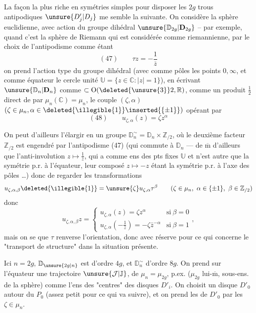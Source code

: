 La façon la plus riche en symétries simples pour disposer les $2g$ trous antipodiques
$\unsure{D'_j|D_j}$ me semble la suivante. On  considère
la sphère euclidienne, avec action du groupe dihédral
$\unsure{\mathbb D_{2g}|\mathbf D_{2g}}$ -- par exemple, quand c'est la sphère de Riemann qui est
considérée comme riemannienne, par le choix de l'antipodisme comme étant
\[
(47)\qquad \tau z=-\frac{1}{\overline z}
\]
on prend l'action type du groupe dihédral (avec comme pôles les points $0,\infty$, et
comme équateur le cercle unité $\mathbb U=\{z\in\mathbb C\mathbin{:}|z|=1\}$),
 en écrivant
$\unsure{\mathbb D_n|\mathbf D_n}$ comme $\subset\operatorname O(\deleted{\unsure{3}}2,\mathbb R)$,
comme un produit $\frac12$ direct de
 par $\mu_n(\mathbb C)=\mu_n$,
le couple $(\zeta,\alpha)$ $(\zeta\in\mu_n,\alpha\in\deleted{\illegible{1}}\inserted{\{\pm1\}})$ opérant par
\[
(48)\qquad u_{\zeta,\alpha}(z)=\zeta z^\alpha
\]


On peut d'ailleurs l'élargir en un groupe
$\mathbb D_n^\sim=\mathbb D_n\times\mathbb Z_{/2}$,
où le deuxième facteur $\mathbb Z_{/2}$ est engendré par l'antipodisme (47)
(qui commute à $\mathbb D_n$ --- de $\overline{\mathrm m}$ d'ailleurs
que l'anti-involution $z\longmapsto\frac{1}{\bar z}$, qui a comme
ens des pts fixes $\mathbb U$ et n'est autre que la symétrie p.r. à
l'équateur, leur composé $z\longmapsto-z$ étant la symétrie p.r. à
l'axe des pôles \ldots) donc de regarder les transformations
\[
u_{\zeta,\alpha,\beta}\deleted{\illegible{1}}
=\unsure{\zeta}u_{\zeta,\alpha}\tau^\beta
\qquad
(\zeta\in\mu_n,\ \alpha\in\{\pm1\},\ \beta\in\mathbb Z_{/2})
\]
donc
\[
u_{\zeta,\alpha,\beta}z=
\begin{cases}
u_{\zeta,\alpha}(z)=\zeta z^\alpha&\mathrm{si}\ \beta=0\\
u_{\zeta,\alpha}(-\frac{1}{\bar z})=-\zeta\bar z^{-\alpha}
&\mathrm{si}\ \beta=1
\end{cases},
\]
mais on se  que $\tau$ renverse l'orientation,
donc 
 avec
réserve pour ce qui concerne le "transport de structure" dans
la situation présente.

Ici $n=2g$, $\mathbb D_{\unsure{2g|n}}$ est d'ordre $4g$, et
$\mathbb D_n^\sim$ d'ordre $8g$. On prend sur l'équateur une
trajectoire $\unsure{\mathcal J|\mathbb J}$, de $\mu_n=\mu_{2g}$, p.ex.
 
 ($\mu_{2g}$
lui-$\overline{\mathrm m}$, 
 sous-ens. de la sphère) comme l'ens des "centres"
des disques $D'_i$. On choisit un disque $D'_0$ autour du
 $P_0$ (assez petit pour ce qui va suivre), et on
prend les  de $D'_0$ par les
$\zeta\in\mu_n$.

